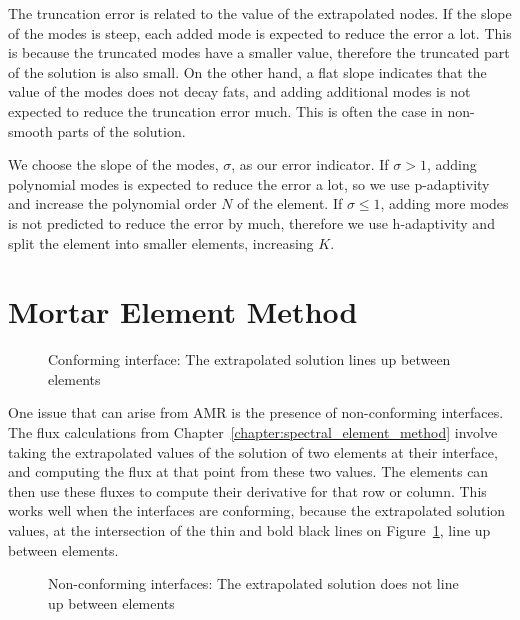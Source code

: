 The truncation error is related to the value of the extrapolated nodes. If the slope of the modes is
steep, each added mode is expected to reduce the error a lot. This is because the truncated modes
have a smaller value, therefore the truncated part of the solution is also small. On the other hand,
a flat slope indicates that the value of the modes does not decay fats, and adding additional modes
is not expected to reduce the truncation error much. This is often the case in non-smooth parts of
the solution.

We choose the slope of the modes, $\sigma$, as our error indicator. If $\sigma > 1$, adding
polynomial modes is expected to reduce the error a lot, so we use p-adaptivity and increase the
polynomial order $N$ of the element. If $\sigma \leqslant 1$, adding more modes is not predicted to
reduce the error by much, therefore we use h-adaptivity and split the element into smaller elements,
increasing $K$.

\section{Mortar Element Method} \label{section:adaptive_mesh_refinement:mortar_element_method}

\begin{figure}[H]
	\centering
	
	\caption{Conforming interface: The extrapolated solution lines up between elements}
	\label{fig:conforming_interfaces}
\end{figure}

One issue that can arise from AMR is the presence of non-conforming interfaces. The flux
calculations from Chapter~\ref{chapter:spectral_element_method} involve taking the extrapolated
values of the solution of two elements at their interface, and computing the flux at that point from
these two values. The elements can then use these fluxes to compute their derivative for that row or
column. This works well when the interfaces are conforming, because the extrapolated solution
values, at the intersection of the thin and bold black lines on
Figure~\ref{fig:conforming_interfaces}, line up between elements.

\begin{figure}[H]
	\centering
	
	\caption{Non-conforming interfaces: The extrapolated solution does not line up between elements}
	\label{fig:non_conforming_interfaces}
\end{figure}

